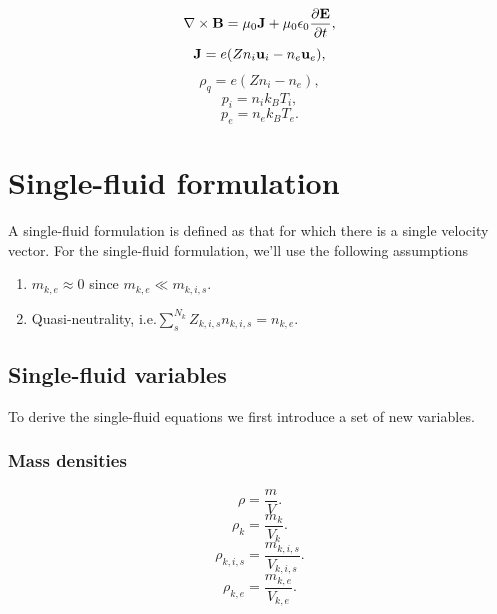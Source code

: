 \documentclass[a4paper,11pt]{report}
\begin{document}
\begin{equation}
    \label{eq:p_waves_maxwell_2}
    \nabla \times \mathbf{B} = \mu_0 \mathbf{J} + \mu_0 \epsilon_0 \frac{\partial \mathbf{E}}{\partial t},
\end{equation}
\begin{equation}
    \label{eq:p_waves_curr_density}
    \mathbf{J} = e (Z n_i \mathbf{u}_i - n_e \mathbf{u}_e),
\end{equation}
\begin{equation}
    \label{eq:p_waves_mass_density}
    \rho_q = e (Z n_i - n_e),
\end{equation}
\begin{equation}
    p_i = n_i k_B T_i,
\end{equation}
\begin{equation}
    p_e = n_e k_B T_e.
\end{equation}

\section{Single-fluid formulation}
A single-fluid formulation is defined as that for which there is a single velocity vector. For the single-fluid formulation, we'll use the following assumptions
\begin{enumerate}
    \item $m_{k,e} \approx 0$ since $m_{k,e} \ll m_{k,i,s}$. \label{eq:sf_no_e_mass} 
    \item Quasi-neutrality, i.e.\@ $\sum_s^{N_k} Z_{k,i,s} n_{k,i,s} = n_{k,e}$. \label{eq:sf_quasi_neutrality}
\end{enumerate}

\subsection{Single-fluid variables}
\label{sec:sf_vars}
To derive the single-fluid equations we first introduce a set of new variables. 

\subsubsection{Mass densities}

\begin{equation}
    \rho = \frac{m}{V}.
\end{equation}
\begin{equation}
    \rho_k= \frac{m_k}{V_k}.
\end{equation}
\begin{equation}
    \rho_{k,i,s}= \frac{m_{k,i,s}}{V_{k,i,s}}.
\end{equation}
\begin{equation}
    \rho_{k,e}= \frac{m_{k,e}}{V_{k,e}}.
\end{equation}
\end{document}
